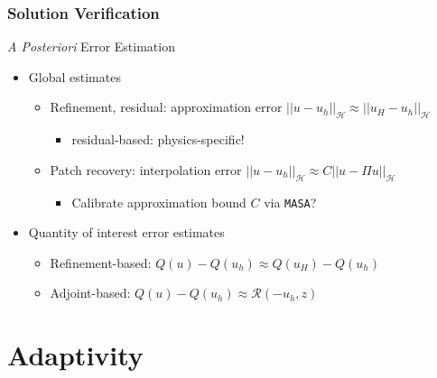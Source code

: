 \documentclass[mathserif]{beamer}
\newcommand{\norm}[1]{\ensuremath{ \left|\left|#1\right|\right|}}
\newcommand{\Res}{{\ensuremath{\mathcal R}}}
\newcommand{\Qoi}{{\ensuremath{Q}}}
\begin{document}
\begin{frame}
\frametitle{Solution Verification}
\begin{block}{\emph{A Posteriori} Error Estimation}
\begin{itemize}
	\item Global estimates
	\begin{itemize}
		\item Refinement, residual: approximation error
			$\norm{u-u_h}_\mathcal{H} \approx
			\norm{u_H-u_h}_\mathcal{H}$
		\begin{itemize}
			\item residual-based: physics-specific!
		\end{itemize}
		\item Patch recovery: interpolation error
			$\norm{u-u_h}_\mathcal{H} \approx
			C \norm{u-\Pi u}_\mathcal{H}$
		\begin{itemize}
			\item Calibrate approximation bound $C$ via \texttt{MASA}?
		\end{itemize}
	\end{itemize}
	\item Quantity of interest error estimates
	\begin{itemize}
		\item Refinement-based: $\Qoi(u) - \Qoi(u_h) \approx
			\Qoi(u_H) - \Qoi(u_h)$
		\item Adjoint-based: $\Qoi(u) - \Qoi(u_h) \approx \Res(-u_h, z)$
	\end{itemize}
	\end{itemize}
\end{block}


\end{frame}



\section{Adaptivity}
\end{document}
